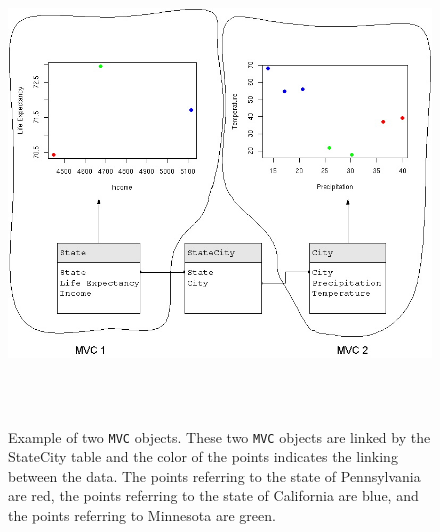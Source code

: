\documentclass[11pt]{article}
\newcommand{\Robject}[1]{{\texttt{#1}}}
\newcommand{\Rpackage}[1]{{\textit{#1}}}
\newcommand{\Rclass}[1]{\texttt{#1}}
\begin{document}
\begin{figure}[ht]
  \begin{center}
    \includegraphics[height=5in, width=6in]{MultipleMVC.jpg}
    \caption{ Example of two \Robject{MVC} objects.  These two \Robject{MVC}
      objects are linked by the StateCity table and the color of the points
    indicates the linking between the data.  The points referring to the state
    of Pennsylvania are red, the points referring to the state of California
    are blue, and the points referring to Minnesota are green. }
    \label{Fig:MultMVC}
  \end{center}
\end{figure}

%
\end{document}
